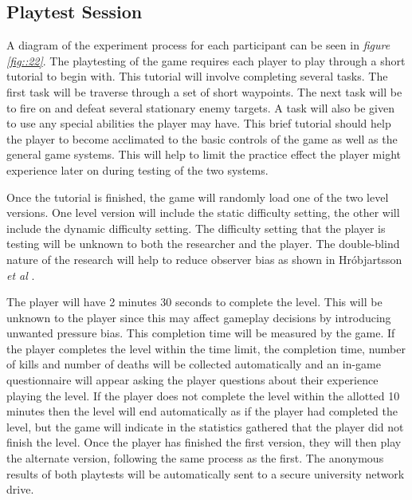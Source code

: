 \documentclass[journal]{IEEEtran}
\begin{document}
\subsection{Playtest Session}
A diagram of the experiment process for each participant can be seen in \textit{figure \ref{fig::22}}. The playtesting of the game requires each player to play through a short tutorial to begin with.  This tutorial will involve completing several tasks. The first task will be traverse through a set of short waypoints. The next task will be to fire on and defeat several stationary enemy targets. A task will also be given to use any special abilities the player may have. This brief tutorial should help the player to become acclimated to the basic controls of the game as well as the general game systems. This will help to limit the practice effect the player might experience later on during testing of the two systems. 

Once the tutorial is finished, the game will randomly load one of the two level versions. One level version will include the static difficulty setting, the other will include the dynamic difficulty setting. The difficulty setting that the player is testing will be unknown to both the researcher and the player. The double-blind nature of the research will help to reduce observer bias as shown in Hróbjartsson \textit{et al} \cite{hrobjartsson2013observer}. 

The player will have 2 minutes 30 seconds to complete the level. This will be unknown to the player since this may affect gameplay decisions by introducing unwanted pressure bias. This completion time will be measured by the game. If the player completes the level within the time limit, the completion time, number of kills and number of deaths will be collected automatically and an in-game questionnaire will appear asking the player questions about their experience playing the level. If the player does not complete the level within the allotted 10 minutes then the level will end automatically as if the player had completed the level, but the game will indicate in the statistics gathered that the player did not finish the level. Once the player has finished the first version, they will then play the alternate version, following the same process as the first. The anonymous results of both playtests will be automatically sent to a secure university network drive.
\end{document}
